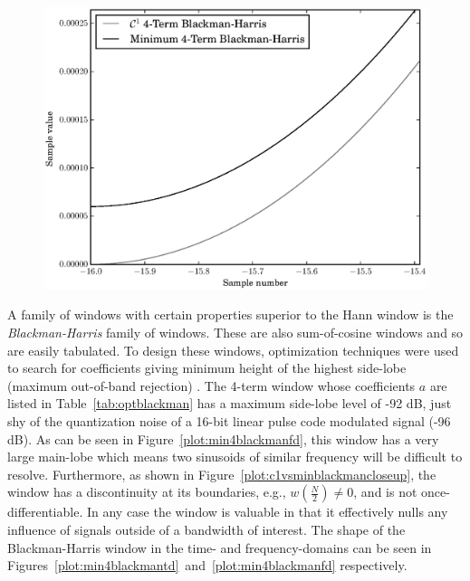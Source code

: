 \begin{figure}[!t]
    \centering
    \includegraphics[width=\figwidthscale\textwidth]{plots/c1_vs_min_blackman_closeup.eps}
\end{figure}

A family of windows with certain properties superior to the Hann window is the
\textit{Blackman-Harris} family of windows. These are also sum-of-cosine windows
and so are easily tabulated. To design these windows, optimization techniques were
used to search for coefficients giving minimum height of the highest side-lobe
(maximum out-of-band rejection) \cite{rabiner1970approach}. The 4-term window
whose coefficients $a$ are listed in Table~\ref{tab:optblackman} has a maximum
side-lobe level of -92 dB, just shy of the quantization noise of a 16-bit linear
pulse code modulated signal (-96 dB). As can be seen in
Figure~\ref{plot:min4blackmanfd}, this window has a very large main-lobe
which means two sinusoids of similar frequency will be difficult to resolve.
Furthermore, as shown in Figure~\ref{plot:c1vsminblackmancloseup}, the window
has a discontinuity at its boundaries, e.g., $w \left( \frac{N}{2} \right) \neq
0$, and is not once-differentiable. In any case the window is valuable in that it
effectively nulls any influence of signals outside of a bandwidth of interest.
The shape of the Blackman-Harris window in the time- and frequency-domains can
be seen in Figures~\ref{plot:min4blackmantd}~and~\ref{plot:min4blackmanfd}
respectively.

